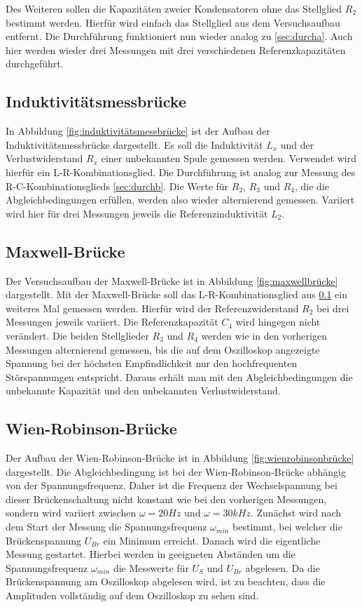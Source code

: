 Des Weiteren sollen die Kapazitäten zweier Kondensatoren ohne das Stellglied $R_2$ bestimmt werden.
Hierfür wird einfach das Stellglied aus dem Versuchsaufbau entfernt.
Die Durchführung funktioniert nun wieder analog zu \ref{sec:durcha}.
Auch hier werden wieder drei Messungen mit drei verschiedenen Referenzkapazitäten durchgeführt.

\subsection{Induktivitätsmessbrücke}
\label{sec:durchc}

In Abbildung \ref{fig:induktivitätsmessbrücke} ist der Aufbau der Induktivitätsmessbrücke dargestellt.
Es soll die Induktivität $L_x$ und der Verlustwiderstand $R_x$ einer unbekannten Spule gemessen werden.
Verwendet wird hierfür ein L-R-Kombinationsglied.
Die Durchführung ist analog zur Messung des R-C-Kombinationsglieds \ref{sec:durchb}.
Die Werte für $R_2$, $R_3$ und $R_4$, die die Abgleichbedingungen erfüllen, werden also wieder alternierend gemessen.
Variiert wird hier für drei Messungen jeweils die Referenzinduktivität $L_2$.

\subsection{Maxwell-Brücke}

Der Versuchsaufbau der Maxwell-Brücke ist in Abbildung \ref{fig:maxwellbrücke} dargestellt.
Mit der Maxwell-Brücke soll das L-R-Kombinationsglied aus \ref{sec:durchc} ein weiteres Mal gemessen werden.
Hierfür wird der Referenzwiderstand $R_2$ bei drei Messungen jeweils variiert.
Die Referenzkapazität $C_4$ wird hingegen nicht verändert.
Die beiden Stellglieder $R_3$ und $R_4$ werden wie in den vorherigen Messungen alternierend gemessen, bis die auf dem Oszilloskop angezeigte Spannung bei der höchsten Empfindlichkeit nur den hochfrequenten Störspannungen entspricht.
Daraus erhält man mit den Abgleichbedingungen die unbekannte Kapazität und den unbekannten Verlustwiderstand.

\subsection{Wien-Robinson-Brücke}
Der Aufbau der Wien-Robinson-Brücke ist in Abbildung \ref{fig:wienrobinsonbrücke} dargestellt.
Die Abgleichbedingung ist bei der Wien-Robinson-Brücke abhängig von der Spannungsfrequenz.
Daher ist die Frequenz der Wechselspannung bei dieser Brückenschaltung nicht konstant wie
bei den vorherigen Messungen, sondern wird variiert zwischen $\omega = 20 Hz$ und $\omega = 30kHz$.
Zunächst wird nach dem Start der Messung die Spannungsfrequenz $\omega_{min}$ bestimmt, bei welcher die Brückenspannung $U_{Br}$ ein Minimum erreicht.
Danach wird die eigentliche Messung gestartet.
Hierbei werden in geeigneten Abständen um die Spannungsfrequenz $\omega_{min}$ die Messwerte für $U_S$ und $U_{Br}$ abgelesen.
Da die Brückenspannung am Oszilloskop abgelesen wird, ist zu beachten, dass die Amplituden vollständig auf dem Oszilloskop zu sehen sind.
\newpage
